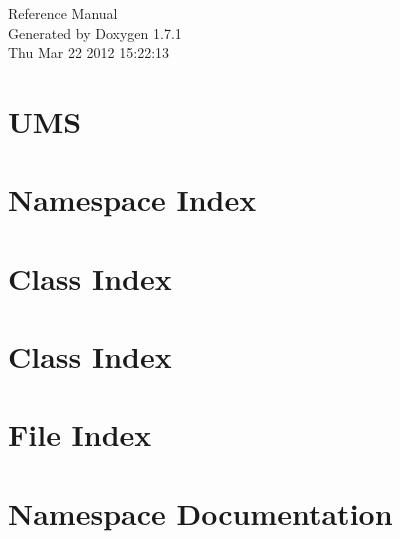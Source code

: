 \documentclass[a4paper]{book}
\begin{document}
\hypersetup{pageanchor=false}
\begin{titlepage}
\vspace*{7cm}
\begin{center}
{\Large Reference Manual}\\
\vspace*{1cm}
{\large Generated by Doxygen 1.7.1}\\
\vspace*{0.5cm}
{\small Thu Mar 22 2012 15:22:13}\\
\end{center}
\end{titlepage}
\clearemptydoublepage
{}
\tableofcontents
\clearemptydoublepage
{}
\hypersetup{pageanchor=true}
\chapter{UMS}
\label{index}\hypertarget{index}{}
\chapter{Namespace Index}

\chapter{Class Index}

\chapter{Class Index}

\chapter{File Index}

\chapter{Namespace Documentation}

\end{document}
